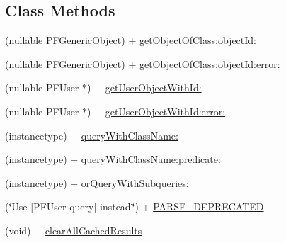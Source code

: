 \subsection*{Class Methods}
\begin{DoxyCompactItemize}
\item 
(nullable P\+F\+Generic\+Object) + \hyperlink{class_p_f_query_a79e6ba681d7091efd03559617c96b629}{get\+Object\+Of\+Class\+:object\+Id\+:}
\begin{DoxyCompactList}\small\item\em 

 \end{DoxyCompactList}\item 
(nullable P\+F\+Generic\+Object) + \hyperlink{class_p_f_query_a6938b4c2d5252ed508b081d7fbad51ad}{get\+Object\+Of\+Class\+:object\+Id\+:error\+:}
\item 
(nullable P\+F\+User $\ast$) + \hyperlink{class_p_f_query_afe20a5feff594138f9e9974ad6ef3c35}{get\+User\+Object\+With\+Id\+:}
\begin{DoxyCompactList}\small\item\em 

 \end{DoxyCompactList}\item 
(nullable P\+F\+User $\ast$) + \hyperlink{class_p_f_query_a74beffa6ee1d7fdf0f01c56fc54595fc}{get\+User\+Object\+With\+Id\+:error\+:}
\item 
(instancetype) + \hyperlink{class_p_f_query_aa315561c832578b903a06f88f1419ad7}{query\+With\+Class\+Name\+:}
\item 
(instancetype) + \hyperlink{class_p_f_query_a566ccd346b7f3696ef1f1e43741f686a}{query\+With\+Class\+Name\+:predicate\+:}
\item 
(instancetype) + \hyperlink{class_p_f_query_a599a14459bc02c077a1aeb4dbd77d29a}{or\+Query\+With\+Subqueries\+:}
\begin{DoxyCompactList}\small\item\em 

 \end{DoxyCompactList}\item 
(\char`\"{}Use \mbox{[}P\+F\+User query\mbox{]} instead.\char`\"{}) + \hyperlink{class_p_f_query_a901b050f600f4d7f7c91d1883240d79b}{P\+A\+R\+S\+E\+\_\+\+D\+E\+P\+R\+E\+C\+A\+T\+E\+D}
\begin{DoxyCompactList}\small\item\em 

 \end{DoxyCompactList}\item 
(void) + \hyperlink{class_p_f_query_afb49ee34ed8d6195fd10ddc8a310613a}{clear\+All\+Cached\+Results}
\end{DoxyCompactItemize}
